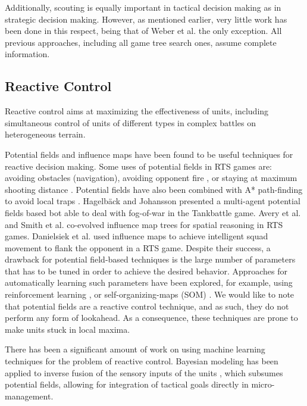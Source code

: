 \documentclass[journal]{IEEEtran}
\begin{document}
Additionally, scouting is equally important in tactical decision making as in strategic decision making. However, as mentioned earlier, very little work has been done in this respect, being that of Weber et al. \cite{WeberAIIDE11} the only exception. All previous approaches, including all game tree search ones, assume complete information.


\subsection{Reactive Control}

Reactive control %
aims at maximizing the effectiveness of units, including simultaneous control of units of different types in complex battles on heterogeneous terrain. 

Potential fields and influence maps have been found to be useful techniques for reactive decision making. Some uses of potential fields in RTS games are: avoiding obstacles (navigation), avoiding opponent fire \cite{uriarte2012kiting}, or staying at maximum shooting distance \cite{Hagelback09}. Potential fields have also been combined with A* path-finding to avoid local traps \cite{Hagelback12}. Hagelb\"{a}ck and Johansson \cite{HagelbackJ08} presented a multi-agent potential fields based bot able to deal with fog-of-war in the Tankbattle game. Avery et al. \cite{Avery09} and Smith et al. \cite{SmithCIG10} co-evolved influence map trees for spatial reasoning in RTS games. Danielsiek et al. \cite{Danielsiek_2008} used influence maps to achieve intelligent squad movement to flank the opponent in a RTS game. Despite their success, a drawback for potential field-based techniques is the large number of parameters that has to be tuned in order to achieve the desired behavior. Approaches for automatically learning such parameters have been explored, for example, using reinforcement learning \cite{Liu_2008}, or self-organizing-maps (SOM) \cite{teamCompositionRTS}. We would like to note that potential fields are a reactive control technique, and as such, they do not perform any form of lookahead. As a consequence, these techniques are prone to make units stuck in local maxima. 


There has been a significant amount of work on using machine learning techniques for the problem of reactive control. Bayesian modeling has been applied to inverse fusion of the sensory inputs of the units \cite{SynnaeveMicroCig11}, which subsumes potential fields, allowing for integration of tactical goals directly in micro-management. 
\end{document}
